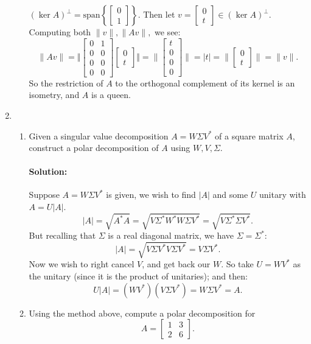 \documentclass{article}
\begin{document}
\begin{enumerate}
\begin{enumerate}[label= (\alph*)]
    $\left( \ker A \right) ^{\perp}=\text{span}\left\{ \begin{bmatrix} 0\\1 \end{bmatrix}  \right\}  $. Then let $v=\begin{bmatrix} 0\\t \end{bmatrix} \in (\ker A)^{\perp}$. Computing both $\|v\|,\|Av\|,$ we see:
    \[
    \|Av\|=\Vert \begin{bmatrix} 0&1\\0&0\\ 0&0\\0&0  \end{bmatrix} \begin{bmatrix} 0\\t \end{bmatrix} \Vert=\|\begin{bmatrix} t\\0\\0\\0  \end{bmatrix} \|=|t|=\|\begin{bmatrix} 0\\t \end{bmatrix} \|=\|v\|
    .\] 
    So the restriction of $A$ to the orthogonal complement of its kernel is an isometry, and $A$ is a queen.
\end{enumerate}
\item \begin{enumerate}[label= (\alph*)] 
\item Given a singular value decomposition $A = W \Sigma V^* $ of a square matrix $A$, construct a polar decomposition of $A$ using $W,V,\Sigma$.
    \paragraph{Solution: }Suppose $A=W\Sigma V ^* $ is given, we wish to find $|A|$ and some $U$ unitary with $A = U|A|$. 
    \[
    |A|=\sqrt{A^* A} =\sqrt{V\Sigma^* W^* W\Sigma V^* } =\sqrt{V\Sigma^* \Sigma V^* } 
    .\] 
    But recalling that $\Sigma$ is a real diagonal matrix, we have $\Sigma=\Sigma^* $:
    \[
    |A|=\sqrt{V\Sigma V^* V\Sigma V^* } =V\Sigma V^* 
    .\] 
    Now we wish to right cancel $V$, and get back our $W$. So take $U=WV^* $ as the unitary (since it is the product of unitaries); and then:
     \[
    U|A|=(WV^* )(V\Sigma V^* )=W\Sigma V^* =A
    .\] 

\item Using the method above, compute a polar decomposition for
\[
    A=\begin{bmatrix} 1&3\\2&6 \end{bmatrix} 
.\] 

\end{enumerate}
\end{enumerate}
\end{document}

